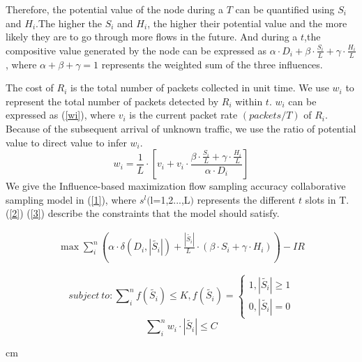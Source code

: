 \documentclass[conference]{IEEEtran}
\begin{document}
Therefore, the potential value of the node during a $T$ can be quantified using $S_i$ and $H_i$.The higher the $S_i$ and $H_i$, the higher their potential value and the more likely they are to go through more flows in the future.
And during a $t$,the compositive value generated by the node can be expressed as $\alpha \cdot D_i +  \beta \cdot \frac{S_i}{L} + \gamma \cdot \frac{H_i}{L}$, where $\alpha + \beta + \gamma =1$ represents the weighted sum of the three influences.%

The cost of $R_i$ is the total number of packets collected in unit time.
We use $w_i$ to represent the total number of packets detected by $R_i$ within $t$. %
 $w_i$ can be expressed as (\ref{wi}), where $v_i$ is the current packet rate $(packets/T)$ of $R_i$. Because of the subsequent arrival of unknown traffic, we use the ratio of potential value to direct value to infer $w_i$.
\begin{equation}
{{w}_{i}}= \frac{1}{L} \cdot [v_i + v_i \cdot \frac{\beta \cdot \frac{S_i}{L} + \gamma \cdot \frac{H_i}{L}}{\alpha \cdot D_i}]
\label{wi}
\end{equation}
We give the Influence-based maximization flow sampling accuracy collaborative sampling model in (\ref{1}), where ${{s}^{l}}($l=1,2...,L$)$ represents the different $t$ slots in T. (\ref{2}) (\ref{3}) describe the constraints that the model should satisfy. 
\begin{spacing}{0.5}
\begin{small}
\begin{equation}
\begin{split}
\max \sum\limits_{i}^{n}{(\alpha \cdot {\delta ({{D}_{i}},\left| \widetilde{{{S}_{i}}} \right|)}+\frac{\left| \widetilde{{{S}_{i}}} \right|}{L\;}\cdot (\beta \cdot {{S}_{i}}+\gamma \cdot {{H}_{i}}))} 
- IR \label{1}
\end{split}
\end{equation}

\begin{equation}
subject \ to: \sum\nolimits_i^n {f(\widetilde {{S_i}}) \le } K,f(\widetilde {{S_i}}) = \left\{ \begin{array}{l}
1,\left| {\widetilde {{S_i}}} \right| \ge 1\\
0,\left| {\widetilde {{S_i}}} \right| = 0
\end{array} \right.\label{2}
\end{equation}
\begin{equation}
\sum\nolimits_{i}^{n}{{{w}_{i}}\cdot \left| \widetilde{{{S}_{i}}} \right|\le C}\label{3}
\end{equation}
\end{small}
\end{spacing}
 cm
\end{document}
